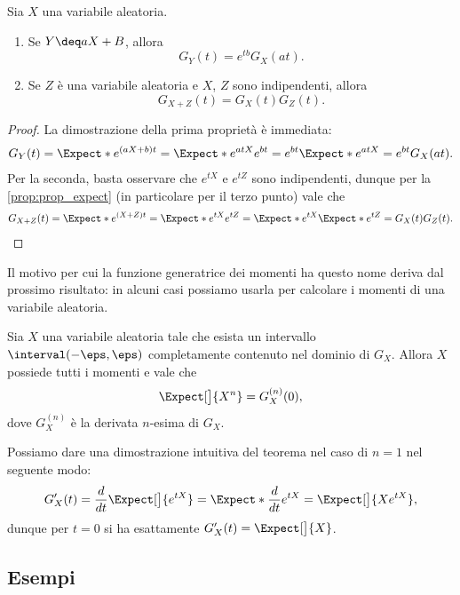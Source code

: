\begin{proposition}
    Sia $X$ una variabile aleatoria.
    \begin{enumerate}[label={(\roman*)}]
        \item Se $Y \deq aX + B$, allora \[
            G_Y(t) = e^{tb} G_X(at).
        \]
        \item Se $Z$ è una variabile aleatoria e $X$, $Z$ sono indipendenti, allora \[
            G_{X + Z}(t) = G_X(t)G_Z(t).    
        \]
    \end{enumerate}
\end{proposition}
\begin{proof}
    La dimostrazione della prima proprietà è immediata: \begin{align*}
        G_Y(t)
        = \Expect*{e^{(aX + b)t}}
        = \Expect*{e^{atX}e^{bt}}
        = e^{bt}\Expect*{e^{atX}}
        = e^{bt}G_X(at).
    \end{align*}
    Per la seconda, basta osservare che $e^{tX}$ e $e^{tZ}$ sono indipendenti, dunque per la \autoref{prop:prop_expect} (in particolare per il terzo punto) vale che \begin{align*}
        G_{X + Z}(t)
        = \Expect*{e^{(X + Z)t}}
        = \Expect*{e^{tX}e^{tZ}}
        = \Expect*{e^{tX}}\Expect*{e^{tZ}}
        = G_X(t)G_Z(t).
    \end{align*}
\end{proof}

Il motivo per cui la funzione generatrice dei momenti ha questo nome deriva dal prossimo risultato: in alcuni casi possiamo usarla per calcolare i momenti di una variabile aleatoria.

\begin{theorem}
     Sia $X$ una variabile aleatoria tale che esista un intervallo $\interval({-\eps, \eps})$ completamente contenuto nel dominio di $G_X$. Allora $X$ possiede tutti i momenti e vale che \[
        \Expect[\big]{X^n} = G_X^{(n)}(0),    
    \] dove $G_X^{(n)}$ è la derivata $n$-esima di $G_X$.
\end{theorem}

Possiamo dare una dimostrazione intuitiva del teorema nel caso di $n = 1$ nel seguente modo: \[
    G_X^\prime(t) = \frac{d}{dt}\Expect[\big]{e^{tX}} = 
    \Expect*{\frac{d}{dt}e^{tX}} = \Expect[\big]{Xe^{tX}},
\] dunque per $t = 0$ si ha esattamente $G_X^\prime(t) = \Expect[\big]{X}$.

\subsection*{Esempi}

